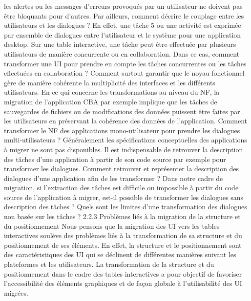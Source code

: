 \documentclass{article}
\begin{document}
les alertes ou les messages d’erreurs provoqu\'{e}s par un utilisateur ne doivent pas \^{e}tre bloquants pour
d’autres. Par ailleurs, comment d\'{e}crire le couplage entre les utilisateurs et les dialogues ? En effet,
une t\^{a}che 5 ou une activit\'{e} est exprim\'{e}e par ensemble de dialogues entre l’utilisateur et le syst\`{e}me
pour une application desktop. Sur une table interactive, une t\^{a}che peut \^{e}tre effectu\'{e}e par plusieurs
utilisateurs de mani\`{e}re concurrente ou en collaboration. Dans ce cas, comment transformer une UI
pour prendre en compte les t\^{a}ches concurrentes ou les t\^{a}ches effectu\'{e}es en collaboration ? Comment
surtout garantir que le noyau fonctionnel g\`{e}re de mani\`{e}re coh\'{e}rente la multiplicit\'{e} des interfaces et
les diff\'{e}rents utilisateurs.
En ce qui concerne les transformations au niveau du NF, la migration de l’application CBA par
exemple implique que les t\^{a}ches de sauvegardes de ﬁchiers ou de modiﬁcations des donn\'{e}es puissent
\^{e}tre faites par les utilisateurs en pr\'{e}servant la coh\'{e}rence des donn\'{e}es de l’application. Comment transformer le NF des applications mono-utilisateur pour prendre les dialogues multi-utilisateurs ?
G\'{e}n\'{e}ralement les sp\'{e}ciﬁcations conceptuelles des applications \`{a} migrer ne sont pas disponibles. Il
est indispensable de retrouver la description des t\^{a}ches d’une application \`{a} partir de son code source
par exemple pour transformer les dialogues. Comment retrouver et repr\'{e}senter la description des dialogues d’une application aﬁn de les transformer ? Dans notre cadre de migration, si l’extraction des
t\^{a}ches est difﬁcile ou impossible \`{a} partir du code source de l’application \`{a} migrer, est-il possible de
transformer les dialogues sans description des t\^{a}ches ? Quels sont les limites d’une transformation des
dialogues non bas\'{e}e sur les t\^{a}ches ?
2.2.3
Probl\`{e}mes li\'{e}s \`{a} la migration de la structure et du positionnement
Nous pensons que la migration des UI vers les tables interactives soul\`{e}ve des probl\`{e}mes li\'{e}s \`{a}
la transformation de sa structure et du positionnement de ses \'{e}l\'{e}ments. En effet, la structure et le
positionnement sont des caract\'{e}ristiques des UI qui se d\'{e}clinent de diff\'{e}rentes mani\`{e}res suivant les
plateformes et les utilisateurs. La transformation de la structure et du positionnement dans le cadre
des tables interactives a pour objectif de favoriser l’accessibilit\'{e} des \'{e}l\'{e}ments graphiques et de fa\c{c}on
globale \`{a} l’utilisabilit\'{e} des UI migr\'{e}es.
\end{document}
